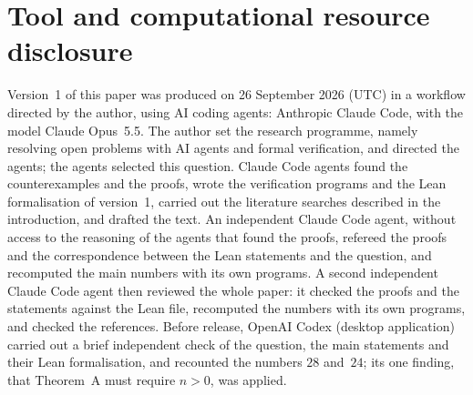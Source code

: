 \documentclass[11pt]{article}
\theoremstyle{remark}
\begin{document}
\section*{Tool and computational resource disclosure}
Version~1 of this paper was produced on 26 September 2026 (UTC) in a workflow
directed by the author, using AI coding agents: Anthropic Claude Code, with
the model Claude Opus~5.5. The author set the research programme, namely
resolving open problems with AI agents and formal verification, and directed
the agents; the agents selected this question. Claude Code agents found the
counterexamples and the proofs, wrote the verification programs and the Lean
formalisation of version~1, carried out the literature searches described in
the introduction, and drafted the text. An independent Claude Code agent,
without access to the reasoning of the agents that found the proofs, refereed
the proofs and the correspondence between the Lean statements and the
question, and recomputed the main numbers with its own programs. A second
independent Claude Code agent then reviewed the whole paper: it checked the
proofs and the statements against the Lean file, recomputed the numbers with
its own programs, and checked the references. Before release, OpenAI Codex
(desktop application) carried out a brief independent check of the question,
the main statements and their Lean formalisation, and recounted the numbers
$28$ and~$24$; its one finding, that Theorem~A must require $n>0$, was
applied.
\end{document}
